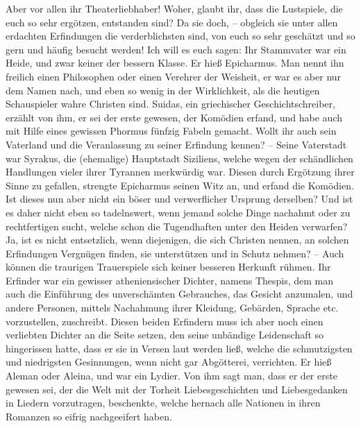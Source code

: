 \medskip

Aber vor allen ihr Theaterliebhaber! Woher, glaubt ihr,
dass die Lustspiele, die
euch so sehr ergötzen, entstanden sind? Da sie doch, -- obgleich sie unter allen
erdachten Erfindungen die verderblichsten sind, von euch so sehr geschätzt und
so gern und häufig besucht werden! Ich will es euch sagen: Ihr Stammvater war
ein Heide, und zwar keiner der bessern Klasse. Er hieß
Epicharmus. Man nennt ihn
freilich einen Philosophen oder einen Verehrer der Weisheit,
er war es aber nur
dem Namen nach, und eben so wenig in der Wirklichkeit, als die heutigen
Schauspieler wahre Christen sind. Suidas, ein
griechischer Geschichtschreiber,
erzählt von ihm, er sei der erste gewesen, der Komödien erfand, und habe auch
mit Hilfe eines gewissen Phormus fünfzig Fabeln
gemacht. Wollt ihr auch sein
Vaterland und die Veranlassung zu seiner Erfindung kennen? -- Seine Vaterstadt
war Syrakus, die (ehemalige) Hauptstadt
Siziliens, welche wegen der schändlichen
Handlungen vieler ihrer Tyrannen merkwürdig war. Diesen durch Ergötzung ihrer
Sinne zu gefallen, strengte Epicharmus seinen Witz
an, und erfand die Komödien.
Ist dieses nun aber nicht ein böser und verwerflicher Ursprung derselben? Und
ist es daher nicht eben so tadelnswert, wenn jemand solche Dinge nachahmt oder
zu rechtfertigen sucht, welche schon die Tugendhaften unter den Heiden
verwarfen? Ja, ist es nicht entsetzlich, wenn diejenigen, die sich Christen
nennen, an solchen Erfindungen Vergnügen finden, sie unterstützen und in Schutz
nehmen? -- Auch können die traurigen Trauerspiele sich keiner besseren Herkunft
rühmen. Ihr Erfinder war ein gewisser atheniensischer Dichter, namens
Thespis, dem man auch die Einführung des unverschämten
Gebrauches, das Gesicht anzumalen,
und andere Personen, mittels Nachahmung ihrer Kleidung, Gebärden, Sprache etc.
vorzustellen, zuschreibt. Diesen beiden Erfindern muss ich aber noch einen
verliebten Dichter an die Seite setzen, den seine unbändige Leidenschaft so
hingerissen hatte, dass er sie in Versen laut werden ließ, welche die
schmutzigsten und niedrigsten Gesinnungen, wenn nicht gar Abgötterei, verrichten.
Er hieß Aleman oder Aleina, und
war ein Lydier. Von ihm sagt man, dass er der
erste gewesen sei, der die Welt mit der Torheit Liebesgeschichten und
Liebesgedanken in Liedern vorzutragen, beschenkte, welche hernach alle Nationen
in ihren Romanzen so eifrig nachgeeifert haben.

